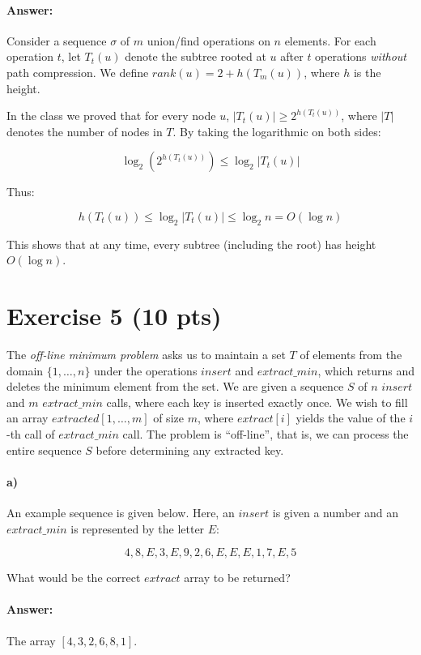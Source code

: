 \documentclass[a4paper]{article}
\begin{document}
\paragraph{Answer:}

Consider a sequence $\sigma$ of $m$ union/find operations on $n$ elements. For each operation $t$, let $T_t(u)$ denote the subtree rooted at $u$ after $t$ operations \emph{without} path compression. We define ${rank}(u) = 2 + h(T_m(u))$, where $h$ is the height.

In the class we proved that for every node $u$, $|T_t(u)| \ge 2^{h(T_t(u))}$, where $|T|$ denotes the number of nodes in $T$. By taking the logarithmic on both sides:

$$\log_2 (2^{h(T_t(u))}) \le \log_2 |T_t(u)|$$

Thus:

$$h(T_t(u)) \le \log_2 |T_t(u)| \le \log_2 n = O(\log n)$$

This shows that at any time, every subtree (including the root) has height $O(\log n)$.

\section{Exercise 5 (10 pts)}

The \emph{off-line minimum problem} asks us to maintain a set $T$ of elements from the domain $\{1, \ldots, n\}$ under the operations $insert$ and $extract\_min$, which returns and deletes the minimum element from the set. We are given a sequence $S$ of $n$ $insert$ and $m$ $extract\_min$ calls, where each key is inserted exactly once. We wish to fill an array $extracted[1,\ldots, m]$ of size $m$, where $extract[i]$ yields the value of the $i$-th call of $extract\_min$ call. The problem is ``off-line'', that is, we can process the entire sequence $S$ before determining any extracted key.

\paragraph{a)} An example sequence is given below. Here, an $insert$ is given a number and an $extract\_min$ is represented by the letter $E$:

$$4,8,E,3,E,9,2,6,E,E,E,1,7,E,5$$

What would be the correct $extract$ array to be returned?

\paragraph{Answer:} The array $[4, 3, 2, 6, 8, 1]$.
\end{document}
